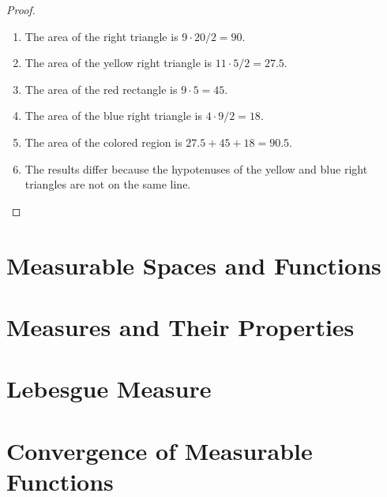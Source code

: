 \begin{proof}
    \begin{enumerate}[label={(\alph*)}]
        \item The area of the right triangle is $9\cdot 20/2 = 90$.
        \item The area of the yellow right triangle is $11\cdot 5 /2 = 27.5$.
        \item The area of the red rectangle is $9\cdot 5 = 45$.
        \item The area of the blue right triangle is $4\cdot 9/2 = 18$.
        \item The area of the colored region is $27.5 + 45 + 18 = 90.5$.
        \item The results differ because the hypotenuses of the yellow and blue right triangles are not on the same line.
    \end{enumerate}
\end{proof}
\newpage

\section{Measurable Spaces and Functions}

\section{Measures and Their Properties}

\section{Lebesgue Measure}

\section{Convergence of Measurable Functions}
